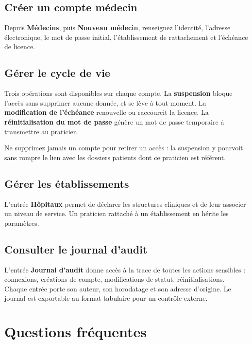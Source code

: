 \subsection*{Créer un compte médecin}

Depuis \textbf{Médecins}, puis \textbf{Nouveau médecin}, renseignez l'identité,
l'adresse électronique, le mot de passe initial, l'établissement de rattachement et
l'échéance de licence.

\subsection*{Gérer le cycle de vie}

Trois opérations sont disponibles sur chaque compte. La \textbf{suspension} bloque
l'accès sans supprimer aucune donnée, et se lève à tout moment. La \textbf{modification
de l'échéance} renouvelle ou raccourcit la licence. La \textbf{réinitialisation du mot
de passe} génère un mot de passe temporaire à transmettre au praticien.

\noindent
Ne supprimez jamais un compte pour retirer un accès : la suspension y pourvoit sans
rompre le lien avec les dossiers patients dont ce praticien est référent.

\subsection*{Gérer les établissements}

L'entrée \textbf{Hôpitaux} permet de déclarer les structures cliniques et de leur
associer un niveau de service. Un praticien rattaché à un établissement en hérite les
paramètres.

\subsection*{Consulter le journal d'audit}

L'entrée \textbf{Journal d'audit} donne accès à la trace de toutes les actions
sensibles : connexions, créations de compte, modifications de statut,
réinitialisations. Chaque entrée porte son auteur, son horodatage et son adresse
d'origine. Le journal est exportable au format tabulaire pour un contrôle externe.

\section{Questions fréquentes}

